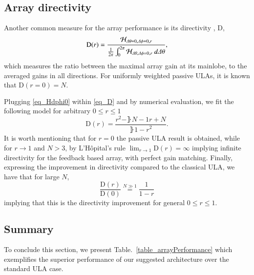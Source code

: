 \subsection*{Array directivity}
Another common measure for the array performance is its directivity \cite{VanTrees2002DetectionIV}, $\mathrm{D}$,
\begin{equation}\label{eq_D}
    \mathrm{D}(r) = \frac{\Hr_{\dTheta=0,\dPhi=0,r}}{\frac{1}{2\pi}\int_{0}^{2\pi}\Hr_{\dTheta,\dPhi=0,r}\ d\dTheta},
\end{equation}
which measures the ratio between the maximal array gain at its mainlobe, to the averaged gains in all directions. For uniformly weighted passive ULAs, it is known \cite{VanTrees2002DetectionIV} that $\mathrm{D}(r=0) = N$.
\par Plugging \eqref{eq_Hdphi0} within \eqref{eq_D} and by numerical evaluation, we fit the following model for arbitrary $0\leq r\leq 1$
\begin{equation}\label{eq_D}
    \mathrm{D}(r) = \frac{r^{2}-\rBrace{N-1}r+N}{\rBrace{1-r}^{2}}.
\end{equation}
It is worth mentioning that for $r=0$ the passive ULA result is obtained, while for $r\to1$ and $N>3$, by L'Hôpital's rule $ \lim_{r\rightarrow 1}\mathrm{D}(r)=\infty$ implying infinite directivity for the feedback based array, with perfect gain matching. Finally, expressing the improvement in directivity compared to the classical ULA, we have that for large $N$,
\begin{equation}\label{eq_Dimprovement}
\frac{\mathrm{D}(r)}{\mathrm{D}(0)}\overset{N\gg1}{=}\frac{1}{1-r}
\end{equation}
implying that this is the directivity improvement for general $0\leq r \leq 1$.
\subsection*{Summary}
To conclude this section, we present Table.~\ref{table_arrayPerformance} which exemplifies the superior performance of our suggested architecture over the standard ULA case.
\begin{table}[h!]
    \centering
 \caption{Comparing performance between the classical ULA and the proposed feedback based architecture, with gain mismatch $r$.}
 \label{table_arrayPerformance}
\end{table}